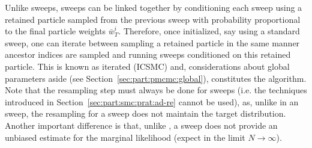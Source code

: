 Unlike \smc sweeps, \csmc sweeps can be linked together by conditioning each sweep using a retained particle
sampled from the previous sweep with probability proportional to the final particle weights $\bar{w}^i_T$.
Therefore, once initialized, say using a standard \smc sweep, one can iterate between sampling a retained
particle in the same manner ancestor indices are sampled and running \csmc sweeps conditioned on this
retained particle.  This is known as iterated \csmc (ICSMC) and, considerations about global parameters 
aside (see Section~\ref{sec:part:pmcmc:global}),  constitutes the \pg algorithm.
Note that the resampling step must always be done for \csmc sweeps (i.e. the techniques introduced in
Section~\ref{sec:part:smc:prat:ad-re} cannot be used), as, unlike in an \smc sweep, the resampling for
a \csmc sweep does not maintain the target distribution.  Another
important difference is that, unlike \smc, a \csmc sweep does not provide an unbiased estimate for the
marginal likelihood (expect in the limit $N\rightarrow\infty$).


